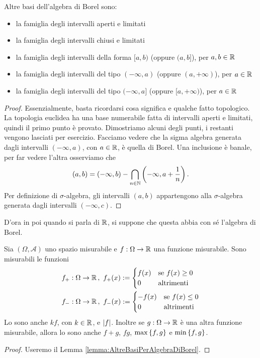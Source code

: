 \begin{lemma}\label{lemma:AltreBasiPerAlgebraDiBorel}
Altre basi dell'algebra di Borel sono:
\begin{itemize}
\item la famiglia degli intervalli aperti e limitati
\item la famiglia degli intervalli chiusi e limitati
\item la famiglia degli intervalli della forma \([a, b)\) (oppure \((a, b]\)), per \(a, b \in \mathbb R\)
\item la famiglia degli intervalli del tipo \((-\infty, a)\) (oppure \((a, +\infty)\)), per \(a \in \mathbb R\)
\item la famiglia degli intervalli del tipo \((-\infty, a]\) (oppure \([a, +\infty)\)), per \(a \in \mathbb R\)
\end{itemize}  
\end{lemma}

\begin{proof}
Essenzialmente, basta ricordarsi cosa significa  e qualche fatto topologico. La topologia euclidea ha una base numerabile fatta di intervalli aperti e limitati, quindi il primo punto è provato. Dimostriamo alcuni degli punti, i restanti vengono lasciati per esercizio.\newline
Facciamo vedere che la sigma algebra generata dagli intervalli \((-\infty, a)\), con \(a \in \mathbb R\), è quella di Borel. Una inclusione è banale, per far vedere l'altra osserviamo che
\[(a, b) = (-\infty, b) - \bigcap_{n \in \mathbb N} \left(-\infty, a+\frac1n\right) .\]
Per definizione di \(\sigma\)-algebra, gli intervalli \((a, b)\) appartengono alla \(\sigma\)-algebra generata dagli intervalli \((-\infty, c)\).
\end{proof}

D'ora in poi quando si parla di \(\mathbb R\), si suppone che questa abbia con sé l'algebra di Borel.

\begin{proposizione}\label{proposizione:ChiusuraFunzioniMisurabili}
Sia \((\Omega, \mathcal A)\) uno spazio misurabile e \(f : \Omega \to \mathbb R\) una funzione misurabile. Sono misurabili le funzioni
%
\begin{align*}
& f_+ : \Omega \to \mathbb R\,, \ f_+(x) := \begin{cases} f(x) & \text{se } f(x) \ge 0 \\ 0 & \text{altrimenti} \end{cases} \\
& f_- : \Omega \to \mathbb R\,, \ f_-(x) := \begin{cases} -f(x) & \text{se } f(x) \le 0 \\ 0 & \text{altrimenti} \end{cases}
\end{align*}
%
Lo sono anche \(k f\), con \(k \in \mathbb R\), e \(\left\lvert f\right\rvert\). Inoltre se \(g : \Omega \to \mathbb R\) è una altra funzione misurabile, allora lo sono anche \(f+g\), \(fg\), \(\max \left\{f, g\right\}\) e \(\min \left\{f, g\right\}\).
\end{proposizione}

\begin{proof}
Useremo il Lemma \ref{lemma:AltreBasiPerAlgebraDiBorel}. 
\end{proof}


